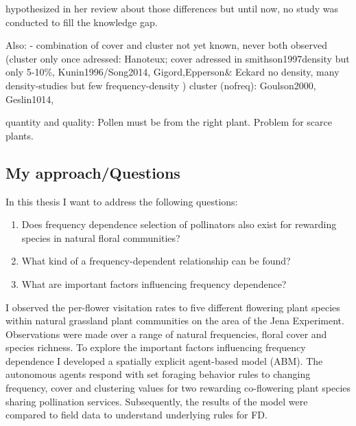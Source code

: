  \cite{smithson2001pollinator} hypothesized in her review about those differences but until now, no study was conducted to fill the knowledge gap. 

Also:
- combination of cover and cluster not yet known, never both observed (cluster only once adressed: Hanoteux; cover adressed in smithson1997density but only 5-10\%, Kunin1996/Song2014, Gigord,Epperson\& Eckard no density, many density-studies but few frequency-density )
cluster (nofreq): Goulson2000, Geslin1014, 


quantity and quality: Pollen must be from the right plant. Problem for scarce plants. 



\subsection*{My approach/Questions}
In this thesis I want to address the following questions: 

\begin{enumerate}
	\item Does frequency dependence selection of pollinators also exist for rewarding species in natural floral communities? \\
	\item	What kind of a frequency-dependent relationship can be found?\\
	\item	What are important factors influencing frequency dependence?\\
\end{enumerate}

I observed the per-flower visitation rates to five different flowering plant species within natural grassland plant communities on the area of the Jena Experiment. Observations were made over a range of natural frequencies, floral cover and species richness. To explore the important factors influencing frequency dependence I developed a spatially explicit agent-based model (ABM). The autonomous agents respond with set foraging behavior rules to changing frequency, cover and clustering values for two rewarding co-flowering plant species sharing pollination services. Subsequently, the results of the model were compared to field data to understand underlying rules for FD. 




%
%
%
%
%
%
